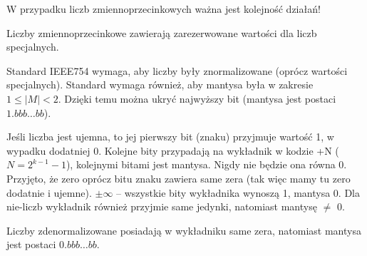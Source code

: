 W przypadku liczb zmiennoprzecinkowych ważna jest kolejność działań!

Liczby zmiennoprzecinkowe zawierają zarezerwowane wartości dla liczb specjalnych.

Standard IEEE754 wymaga, aby liczby były znormalizowane (oprócz wartości specjalnych). Standard wymaga również, aby mantysa była w zakresie $1 \le |M| < 2$. Dzięki temu można ukryć najwyższy bit (mantysa jest postaci $1.bbb\ldots bb$).

Jeśli liczba jest ujemna, to jej pierwszy bit (znaku) przyjmuje wartość 1, w wypadku dodatniej 0. Kolejne bity przypadają na wykładnik w kodzie +N ($N = 2^{k-1}-1$), kolejnymi bitami jest mantysa. Nigdy nie będzie ona równa 0. Przyjęto, że zero oprócz bitu znaku zawiera same zera (tak więc mamy tu zero dodatnie i ujemne). $\pm\infty$ -- wszystkie bity wykładnika wynoszą 1, mantysa 0. Dla nie-liczb wykładnik również przyjmie same jedynki, natomiast mantysę $\ne$ 0.

Liczby zdenormalizowane posiadają w wykładniku same zera, natomiast mantysa jest postaci $0.bbb\ldots bb$.

